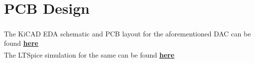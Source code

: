 \documentclass[oneside]{book}
\begin{document}
\chapter{PCB Design}
The KiCAD EDA\textsuperscript{\textregistered} schematic and PCB layout for the aforementioned DAC can be found \href{https://github.com/HarryNyquist/Elektronica/tree/main/PCB/ADC_DAC_Converter/DAC_Converter%20-%20KiCAD}{\underline{\textbf{here}}}
\\ \bigskip
The LTSpice\textsuperscript{\textregistered} simulation for the same can be found \href{https://github.com/HarryNyquist/Elektronica/tree/main/PCB/ADC_DAC_Converter/DAC_Converter%20-%20LTSpice%20Simulations}{\underline{\textbf{here}}}
\end{document}
